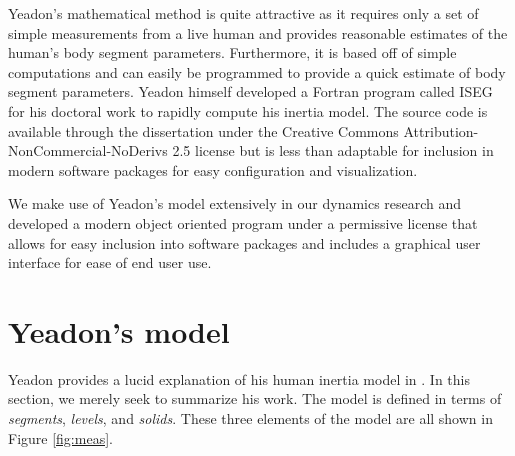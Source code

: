 \documentclass[10pt]{article}
\begin{document}
Yeadon's mathematical method is quite attractive as it requires only a set of
simple measurements from a live human and provides reasonable estimates of the
human's body segment parameters. Furthermore, it is based off of simple
computations and can easily be programmed to provide a quick estimate of body
segment parameters. Yeadon himself developed a Fortran program called ISEG for
his doctoral work \cite{Yeadon1984a} to rapidly compute his inertia model. The
source code is available through the dissertation under the Creative Commons
Attribution-NonCommercial-NoDerivs 2.5 license but is less than adaptable for
inclusion in modern software packages for easy configuration and visualization.

We make use of Yeadon's model extensively in our dynamics research and
developed a modern object oriented program under a permissive license that
allows for easy inclusion into software packages and includes a graphical user
interface for ease of end user use.

\section*{Yeadon's model}

Yeadon provides a lucid explanation of his human inertia model in
\cite{Yeadon1990c}. In this section, we merely seek to summarize his work. The
model is defined in terms of \emph{segments}, \emph{levels}, and \emph{solids}.
These three elements of the model are all shown in Figure \ref{fig:meas}.
\end{document}
